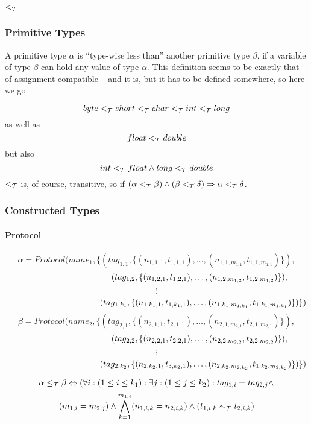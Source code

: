 \documentclass[]{article}
\begin{document}
\subsection{$<_{\cal T}$}

\subsubsection{Primitive Types}

A primitive type $\alpha$ is ``type-wise less than'' another primitive type $\beta$, if 
a variable of type $\beta$ can hold any value of type $\alpha$. This definition seems to be exactly that of assignment compatible -- and it is, but it has to be defined somewhere, so here we go:

\[
byte <_{\cal T} short <_{\cal T} char <_{\cal T} int <_{\cal T} long
\]
as well as 
\[
float <_{\cal T} double
\]
but also
\[
int <_{\cal T} float \wedge long <_{\cal T} double
\]
$<_{\cal T}$ is, of course, transitive, so if $(\alpha <_{\cal T} \beta) \wedge (\beta <_{\cal T} \delta) \Rightarrow \alpha <_{\cal T} \delta$.
\subsubsection{Constructed Types}

\paragraph{Protocol}

\[
\alpha = Protocol(name_1,\{(tag_{1,1},\{(n_{1,1,1},t_{1,1,1}),\ldots,(n_{1,1,m_{1,1}},t_{1,1,m_{1,1}})\}),
\]
\[
\hspace*{3.6cm}(tag_{1,2},\{(n_{1,2,1},t_{1,2,1}),\ldots,(n_{1,2,m_{1,2}},t_{1,2,m_{1,2}})\}),
\]
\[
\vdots
\]
\[
\hspace*{3.9cm}(tag_{1,k_1},\{(n_{1,k_1,1},t_{1,k_1,1}),\ldots,(n_{1,k_1,m_{1,k_1}},t_{1,k_1,m_{1,k_1}})\})\})
\]
\[
\beta = Protocol(name_2,\{(tag_{2,1},\{(n_{2,1,1},t_{2,1,1}),\ldots,(n_{2,1,m_{2,1}},t_{2,1,m_{2,1}})\}),
\]
\[
\hspace*{3.6cm}(tag_{2,2},\{(n_{2,2,1},t_{2,2,1}),\ldots,(n_{2,2,m_{2,2}},t_{2,2,m_{2,2}})\}),
\]
\[
\vdots
\]
\[
\hspace*{3.9cm}(tag_{2,k_2},\{(n_{2,k_2,1},t_{3,k_2,1}),\ldots,(n_{2,k_2,m_{2,k_2}},t_{1,k_2,m_{2,k_2}})\})\})
\]

\[
\alpha \leq_{\cal T} \beta \Leftrightarrow (\forall i: (1 \leq i \leq k_1): \exists j: (1 \leq j \leq k_2): tag_{1,i} = tag_{2,j} \wedge 
\]
\[
(m_{1,i} = m_{2,j}) \wedge \bigwedge^{m_{1,i}}_{k=1}(n_{1,i,k} = n_{2,i,k}) \wedge (t_{1,i,k} \sim_{\cal T} t_{2,i,k})
\]
\end{document}
